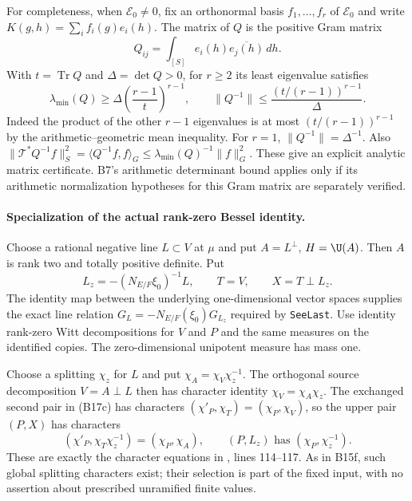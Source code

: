 \documentclass[11pt]{article}
\theoremstyle{definition}\newtheorem{definition}[theorem]{Definition}\newtheorem{remark}[theorem]{Remark}
\begin{document}
For completeness, when $\mathcal E_0\ne0$, fix an orthonormal basis $f_1,\ldots,f_r$ of
$\mathcal E_0$ and write $K(g,h)=\sum_i f_i(g)e_i(h)$. The matrix
of $Q$ is the positive Gram matrix
\[
 Q_{ij}=\int_{[S]}e_i(h)\overline{e_j(h)}\,dh .
\]
With $t=\operatorname{Tr}Q$ and $\Delta=\det Q>0$, for $r\geq2$
its least eigenvalue satisfies
\[
 \lambda_{\min}(Q)\geq
       \Delta\left(\frac{r-1}{t}\right)^{r-1},
 \qquad
 \|Q^{-1}\|\leq
       \frac{(t/(r-1))^{r-1}}{\Delta}.
 \tag{B17f}
\]
Indeed the product of the other $r-1$ eigenvalues is at most
$(t/(r-1))^{r-1}$ by the arithmetic--geometric mean inequality.
For $r=1$, $\|Q^{-1}\|=\Delta^{-1}$.
Also
$\|\mathcal T^*Q^{-1}f\|_S^2
 =\langle Q^{-1}f,f\rangle_G
 \leq\lambda_{\min}(Q)^{-1}\|f\|_G^2$.
These give an explicit analytic matrix certificate. B7's
arithmetic determinant bound applies only if its arithmetic
normalization hypotheses for this Gram matrix are separately
verified.

\paragraph{Specialization of the actual rank-zero Bessel identity.}
Choose a rational negative line $L\subset V$ at $\mu$ and put
$A=L^\perp$, $H=\U(A)$. Then $A$ is rank two and totally
positive definite. Put
\[
 L_z=-(N_{E/F}\xi_0)^{-1}L,\qquad
 T=V,\qquad X=T\perp L_z .
\]
The identity map between the underlying one-dimensional vector
spaces supplies the exact line relation
$G_L=-N_{E/F}(\xi_0)G_{L_z}$ required by
\texttt{SeeLast}. Use identity rank-zero Witt decompositions
for $V$ and $P$ and the same measures on the identified copies.
The zero-dimensional unipotent measure has mass one.

Choose a splitting $\chi_z$ for $L$ and put
$\chi_A=\chi_V\chi_z^{-1}$. The orthogonal source decomposition
$V=A\perp L$ then has character identity
$\chi_V=\chi_A\chi_z$. The exchanged second pair in (B17c)
has characters $(\chi'_P,\chi_T)=(\chi_P,\chi_V)$, so the
upper pair $(P,X)$ has characters
\[
 (\chi'_P,\chi_T\chi_z^{-1})=(\chi_P,\chi_A),
 \qquad (P,L_z)\text{ has }(\chi_P,\chi_z^{-1}).
\]
These are exactly the character equations in
,
lines 114--117. As in B15f,
such global splitting characters exist; their selection is
part of the fixed input, with no assertion about prescribed
unramified finite values.
\end{document}
